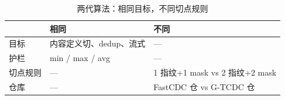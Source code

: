 \begin{table}[htbp]
\centering
\caption{两代算法：相同目标，不同切点规则}
\small
\begin{tabular}{@{}p{2.5cm}p{5.5cm}p{5.5cm}@{}}
\toprule
\textbf{} & \textbf{相同} & \textbf{不同} \\
\midrule
目标 & 内容定义切、dedup、流式 & — \\
护栏 & min / max / avg & — \\
切点规则 & — & 1 指纹+1 mask vs 2 指纹+2 mask \\
仓库 & — & FastCDC 仓 vs G-TCDC 仓 \\
\bottomrule
\end{tabular}
\end{table}
